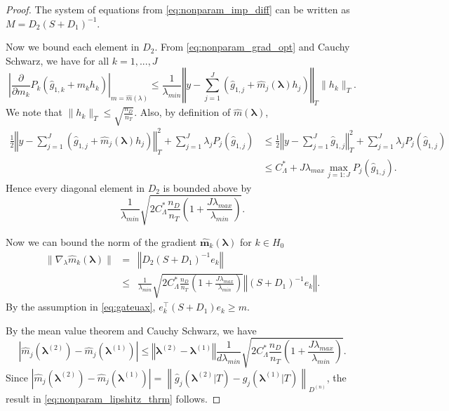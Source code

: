 \documentclass[10pt]{book}
\theoremstyle{definition}
\begin{document}
\begin{proof}
	
	The system of equations from \eqref{eq:nonparam_imp_diff} can be written as  $M=D_{2}\left(S+D_{1}\right)^{-1}$.
	
	Now we bound each element in $D_2$. From \eqref{eq:nonparam_grad_opt} and Cauchy Schwarz, we have for all $k=1,...,J$
	\begin{equation}
	\left|\frac{\partial}{\partial m_{k}}P_{k}(\hat{g}_{1,k}+m_{k}h_{k})\right|_{m=\hat{m}(\lambda)}
	\le 
	\frac{1}{\lambda_{min}}
	\left\Vert y-\sum_{j=1}^{J}\left(\hat{g}_{1,j}+\hat{m}_{j}(\boldsymbol{\lambda})h_{j}\right)
	\right\Vert _{T}\|h_{k}\|_{T}.
	\end{equation}
	We note that $\|h_{k}\|_{T} \le \sqrt{\frac{n_{D}}{n_{T}}}$. Also, by definition of $\hat{m}(\boldsymbol{\lambda})$,
	\begin{align*}
	\frac{1}{2}\left\Vert y-\sum_{j=1}^{J}\left(\hat{g}_{1,j}+\hat{m}_{j}(\boldsymbol{\lambda})h_{j}\right)\right\Vert _{T}^{2}+\sum_{j=1}^{J}\lambda_{j}P_{j}(\hat{g}_{1,j})
	& \le \frac{1}{2}\left\Vert y-\sum_{j=1}^{J}\hat{g}_{1,j}\right\Vert _{T}^{2}+\sum_{j=1}^{J}\lambda_{j}P_{j}(\hat{g}_{1,j})\\
	& \le C_{\Lambda}^* + J\lambda_{max}\max_{j=1:J}P_{j}(\hat{g}_{1,j}).
	\end{align*}
	Hence every diagonal element in $D_2$ is bounded above by
	\begin{equation}
	\frac{1}{\lambda_{min}}
	\sqrt{2C_{\Lambda}^* \frac{n_{D}}{n_{T}}\left(1+\frac{J\lambda_{max}}{\lambda_{min}}\right)}.
	\end{equation}
	
	
	Now we can bound the norm of the gradient $\boldsymbol{\hat{m}}_k(\boldsymbol{\lambda})$ for $k \in H_0$
	\begin{eqnarray}
	\|\nabla_{\lambda}\hat{m}_{k}(\boldsymbol{\lambda})\|
	& = & \left\Vert D_{2}\left(S+D_{1}\right)^{-1}e_{k}\right\Vert \\
	& \le & \frac{1}{\lambda_{min}}
	\sqrt{2C_{\Lambda}^*
		\frac{n_{D}}{n_{T}}\left(1+\frac{J\lambda_{max}}{\lambda_{min}}\right)}\left\Vert \left(S+D_{1}\right)^{-1}e_{k}\right\Vert.
	\end{eqnarray}
	By the assumption in \eqref{eq:gateuax}, $e_{k}^\top \left(S+D_{1}\right) e_{k} \ge m$.
	
	By the mean value theorem and Cauchy Schwarz, we have
	\begin{equation}
	\left|\hat{m}_{j}(\boldsymbol{\lambda}^{(2)})-\hat{m}_{j}(\boldsymbol{\lambda}^{(1)})\right| 
	\le \left\Vert \boldsymbol{\lambda}^{(2)}-\boldsymbol{\lambda}^{(1)}\right\Vert \frac{1}{d\lambda_{min}}\sqrt{2C^*_\Lambda \frac{n_{D}}{n_{T}}\left(1+\frac{J\lambda_{max}}{\lambda_{min}}\right)}.
	\end{equation}
	Since $
	\left|
	\hat{m}_{j}(\boldsymbol{\lambda}^{(2)})-\hat{m}_{j}(\boldsymbol{\lambda}^{(1)})
	\right|  =
	\left \| 
	\hat{g}_{j}(\boldsymbol{\lambda}^{(2)}|T)-\hat{g}_{j}(\boldsymbol{\lambda}^{(1)}|T)
	\right  \|_{D^{(n)}}
	$, the result in \eqref{eq:nonparam_lipshitz_thrm} follows.
\end{proof}
\end{document}
